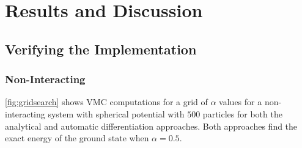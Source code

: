 \section{Results and Discussion}\label{sec:Results}

\subsection{Verifying the Implementation}\label{sec:project results}

\subsubsection{Non-Interacting}

\autoref{fig:gridsearch} shows VMC computations for a grid of $\alpha$ values for a non-interacting system with spherical potential with $500$ particles for both the analytical and automatic differentiation approaches. Both approaches find the exact energy of the ground state when $\alpha=0.5$. 

